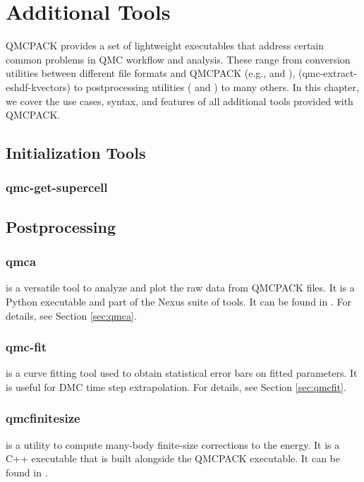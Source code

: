 \chapter{Additional Tools}
\label{chap:additional_tools}
QMCPACK provides a set of lightweight executables that address certain
common problems in QMC workflow and analysis.  These range from conversion utilities between 
different file formats and QMCPACK (e.g.,  and ),  
(qmc-extract-eshdf-kvectors) to postprocessing utilities ( and ) to many others.  In this chapter, we cover the use cases, syntax, and features of all additional tools provided with QMCPACK.  

\section{Initialization Tools}
  \subsection{qmc-get-supercell}

\section{Postprocessing}
  \subsection{qmca}
     is a versatile tool to analyze and plot the raw data from QMCPACK  files.
    It is a Python executable and part of the Nexus suite of tools.  It can be found in 
    . For details, see Section \ref{sec:qmca}.
  \subsection{qmc-fit}
     is a curve fitting tool used to obtain statistical error bars on fitted parameters.
    It is useful for DMC time step extrapolation.  For details, see Section \ref{sec:qmcfit}.
  \subsection{qmcfinitesize}
     is a utility to compute many-body finite-size corrections to the energy.  It
    is a C++ executable that is built alongside the QMCPACK executable.  It can be found in 
    .

